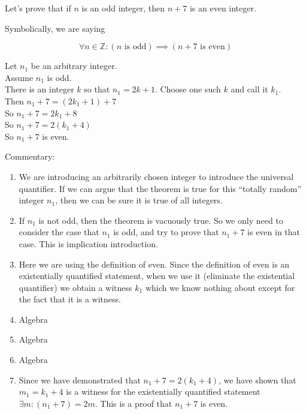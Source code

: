 \begin{example}
		Let's prove that if $n$ is an odd integer, then $n+7$ is an even integer.
		
		Symbolically, we are saying
		
		\[
		 \forall n \in \mathbb{Z}: (\textrm{$n$ is odd}) \implies (\textrm{$n+7$ is even})
		\]
		
		\begin{fitch}
				\textrm{Let $n_1$ be an arbitrary integer.}\\
				\textrm{Assume $n_1$ is odd.}\\
				\fa \textrm{There is an integer $k$ so that $n_1  = 2k+1$.  Choose one such $k$ and call it $k_1$. }\\
				\fa \textrm{Then $n_1+7 = (2k_1+1)+7$}\\
				\fa \textrm{So $n_1+ 7 = 2k_1 +8$}\\
				\fa \textrm{So $n_1+ 7 = 2(k_1+4)$}\\
				\fa \textrm{So $n_1 + 7$ is even.}
			\end{fitch}
		
		Commentary:
		
		\begin{enumerate}
			\item We are introducing an arbitrarily chosen integer to introduce the universal quantifier.  If we can argue that the theorem is true for this  ``totally random'' integer $n_1$, then we can be sure it is true of all integers.
			\item If $n_1$ is not odd, then the theorem is vacuously true.  So we only need to consider the case that $n_1$ is odd, and try to prove that $n_1+7$ is even in that case.  This is implication introduction.
			\item Here we are using the definition of even.  Since the definition of even is an existentially quantified statement, when we use it (eliminate the existential quantifier) we obtain a witness $k_1$ which we know nothing about except for the fact that it is a witness.
			\item Algebra
			\item Algebra
			\item Algebra
			\item Since we have demonstrated that $n_1+7 = 2(k_1+4)$, we have shown that $m_1 = k_1+4$ is a witness for the existentially quantified statement $\exists m : (n_1+7) = 2m $.  This is a proof that $n_1+7$ is even.
			\end{enumerate}
	\end{example}

